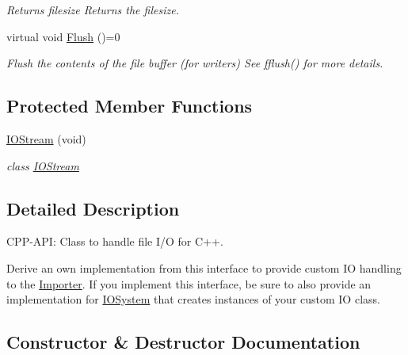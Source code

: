 \begin{DoxyCompactItemize}
\begin{DoxyCompactList}\small\item\em Returns filesize Returns the filesize. \end{DoxyCompactList}\item 
virtual void \hyperlink{class_assimp_1_1_i_o_stream_a7c19952446ece90924b246f087417899}{Flush} ()=0\hypertarget{class_assimp_1_1_i_o_stream_a7c19952446ece90924b246f087417899}{}\label{class_assimp_1_1_i_o_stream_a7c19952446ece90924b246f087417899}

\begin{DoxyCompactList}\small\item\em Flush the contents of the file buffer (for writers) See fflush() for more details. \end{DoxyCompactList}\end{DoxyCompactItemize}
\subsection*{Protected Member Functions}
\begin{DoxyCompactItemize}
\item 
\hyperlink{class_assimp_1_1_i_o_stream_af5ae78123b6c6f7afc31b2a52dc9192e}{I\+O\+Stream} (void)
\begin{DoxyCompactList}\small\item\em class \hyperlink{class_assimp_1_1_i_o_stream}{I\+O\+Stream} \end{DoxyCompactList}\end{DoxyCompactItemize}


\subsection{Detailed Description}
C\+P\+P-\/\+A\+PI\+: Class to handle file I/O for C++. 

Derive an own implementation from this interface to provide custom IO handling to the \hyperlink{class_assimp_1_1_importer}{Importer}. If you implement this interface, be sure to also provide an implementation for \hyperlink{class_assimp_1_1_i_o_system}{I\+O\+System} that creates instances of your custom IO class. 

\subsection{Constructor \& Destructor Documentation}
